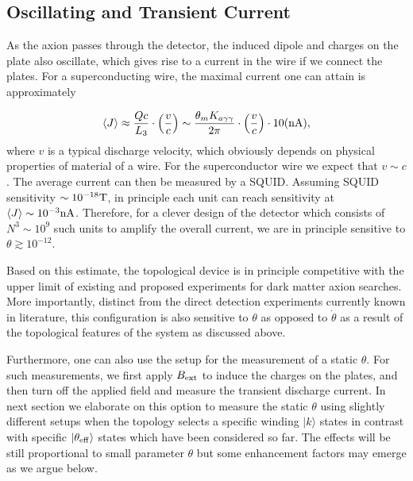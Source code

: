 \documentclass[ twocolumn,aps,prd,   
               preprintnumbers,numbers,sort&compress,nofootinbib,
                            showpacs,superscriptaddress,
               colorlinks,
               linkcolor=blue,   
               citecolor=blue]{revtex4-1}   \newcommand{\exclude}[1]{}
\newcommand{\be}{\begin{eqnarray}}
\newcommand{\ee}{\end{eqnarray}}
\begin{document}
\subsection{Oscillating and Transient Current}\label{subsec:transientcurrent}
As the axion   passes through the detector, the induced dipole and charges on the plate also oscillate, which gives rise to a current in the wire
if we connect the plates. For a superconducting wire, the maximal current one can attain is approximately 

\be
\langle J \rangle \approx \frac{Q c}{L_3}\cdot \left(\frac{v}{c} \right)\sim  \frac{\theta_m K_{a\gamma\gamma}}{2\pi}\cdot  \left(\frac{v}{c} \right) \cdot 10 \rm (nA),
\ee
where $v$ is a typical discharge velocity, which obviously depends on physical properties of  material of a wire. For the superconductor wire we expect that $v\sim c$. 
 The average current can then be measured by a SQUID. Assuming SQUID sensitivity $\sim 10^{-18}\rm T$, in principle each unit can reach sensitivity at $\langle J\rangle \sim 10^{-3} \rm nA$. Therefore, for a clever design of the detector which consists of $N^3\sim 10^9$ such units to amplify the overall current, we are in principle sensitive to $\theta \gtrsim 10^{-12}$.
 
 Based on this estimate, the topological device is in principle competitive with the upper limit of existing and proposed experiments for dark matter axion searches. More importantly, distinct from the direct detection experiments currently known in literature, this configuration is also sensitive to $\theta$ as opposed to $\dot{\theta}$ as a result of the topological features of the system as discussed above. 

Furthermore, one can also use the setup for the measurement of a static $\theta$. For such measurements, we first apply $B_{\rm ext}$ to induce the charges on the plates, and then turn off the applied field and measure the transient discharge current. In next section we elaborate on this option to measure the static $\theta$ using slightly different setups when the topology selects  a specific winding  $|k\rangle$ states
in contrast with specific $|\theta_{\rm eff}\rangle $ states which have been considered so far. The effects will be  still proportional to small parameter $\theta$ 
but some enhancement factors may emerge as we argue below. 
\end{document}
